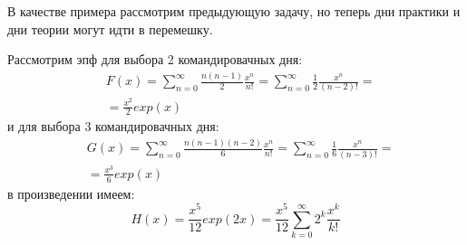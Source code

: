 В качестве примера рассмотрим предыдующую задачу, но теперь дни практики и дни теории могут идти в перемешку.

Рассмотрим эпф для выбора 2 командировачных дня:
\[
	\begin{split}
		& F\left(x\right) = \sum_{n=0}^\infty \frac{n\left(n-1\right)}{2} \frac{x^n}{n!} = \sum_{n=0}^\infty \frac{1}{2} \frac{x^n}{\left(n-2\right)!} = \\
		& = \frac{x^2}{2} exp\left(x\right)
	\end{split}
\]
и для выбора 3 командировачных дня:
\[
	\begin{split}
		& G\left(x\right) = \sum_{n=0}^\infty \frac{n\left(n-1\right)\left(n-2\right)}{6} \frac{x^n}{n!} = \sum_{n=0}^\infty \frac{1}{6} \frac{x^n}{\left(n-3\right)!} = \\
		& = \frac{x^3}{6} exp\left(x\right)
	\end{split}
\]
в произведении имеем:
\[
	H\left(x\right) = \frac{x^5}{12} exp\left(2x\right) = \frac{x^5}{12} \sum_{k=0}^\infty 2^k \frac{x^k}{k!}
\]
